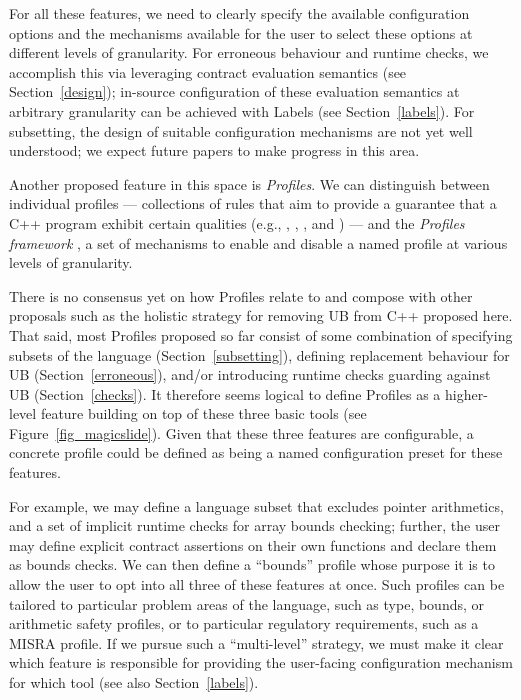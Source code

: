{For all these features, we need to clearly specify the available configuration options and the mechanisms available for the user to select these options at different levels of granularity. For erroneous behaviour and runtime checks, we accomplish this via leveraging contract evaluation semantics (see Section~\ref{design}); in-source configuration of these evaluation semantics at arbitrary granularity can be achieved with Labels (see Section~\ref{labels}). For subsetting, the design of suitable configuration mechanisms are not yet well understood; we expect future papers to make progress in this area.

Another proposed feature in this space is \emph{Profiles}. We can distinguish between individual profiles --- collections of rules that aim to provide a guarantee that a C++ program exhibit certain qualities (e.g., \cite{P3081R2}, \cite{P3038R0}, \cite{P3402R3}, and \cite{P3446R0}) --- and the \emph{Profiles framework} \cite{P3589R2}, a set of mechanisms to enable and disable a named profile at various levels of granularity.

There is no consensus yet on how Profiles relate to and compose with other proposals such as the holistic strategy for removing UB from C++ proposed here. That said, most Profiles proposed so far consist of some combination of specifying subsets of the language (Section~\ref{subsetting}), defining replacement behaviour for UB (Section~\ref{erroneous}), and/or introducing runtime checks guarding against UB (Section~\ref{checks}). It therefore seems logical to define Profiles as a higher-level feature building on top of these three basic tools (see Figure~\ref{fig_magicslide}). Given that these three features are configurable, a concrete profile could be defined as being a named configuration preset for these features. 

For example, we may define a language subset that excludes pointer arithmetics, and a set of implicit runtime checks for array bounds checking; further, the user may define explicit contract assertions on their own functions and declare them as bounds checks. We can then define a ``bounds'' profile whose purpose it is to allow the user to opt into all three of these features at once. Such profiles can be tailored to particular problem areas of the language, such as type, bounds, or arithmetic safety profiles, or to particular regulatory requirements, such as a MISRA profile. If we pursue such a ``multi-level'' strategy, we must make it clear which feature is responsible for providing the user-facing configuration mechanism for which tool (see also Section~\ref{labels}).

}
